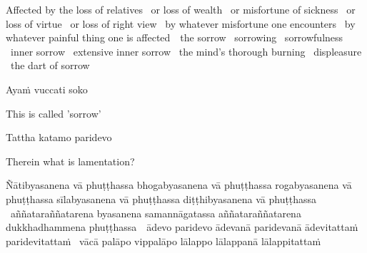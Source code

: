 \begin{english-hang-verses}
  Affected by the loss of relatives \breathmark\ or loss of wealth \breathmark\ or misfortune of sickness \breathmark\ or loss of virtue \breathmark\ or loss of right view\makeatletter\hyperlink{endnote84-appendix}\makeatother
  \breathmark\ by whatever misfortune one encounters \breathmark\ by whatever painful thing one is \mbox{affected}~\breathmark\ the sorrow \breathmark\ sorrowing \breathmark\ sorrowfulness \breathmark\ inner sorrow \breathmark\ extensive inner sorrow \breathmark\ the mind's thorough burning \breathmark\ displeasure \breathmark\ the dart of sorrow
\end{english-hang-verses}

Ayaṁ vuccati soko

\begin{english}
  This is called 'sorrow'
\end{english}

Tattha katamo paridevo

\begin{english}
  Therein what is lamentation?
\end{english}

\begin{pali-hang}
  Ñātibyasanena vā phuṭṭhassa bhogabyasanena vā phuṭṭhassa rogabyasanena vā phuṭṭhassa sīlabyasanena vā phuṭṭhassa diṭṭhibyasanena vā phuṭṭhassa \breathmark\ aññataraññatarena byasanena samannāgatassa aññataraññatarena dukkhadhammena \mbox{phuṭṭhassa}~\breathmark\ ādevo paridevo ādevanā paridevanā ādevitattaṁ paridevitattaṁ \breathmark\ vācā palāpo vippalāpo lālappo lālappanā lālappitattaṁ
\end{pali-hang}

